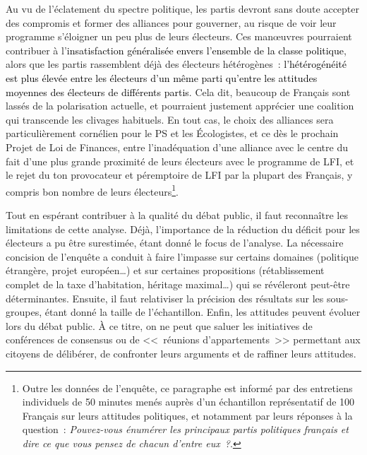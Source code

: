 \documentclass[12pt,french]{article}
\newcommand{\blue}[1]{\textcolor{black}{#1}} %
\begin{document}
Au vu de l'éclatement du spectre politique, les partis devront sans doute accepter des compromis et former des alliances pour gouverner, au risque de voir leur programme s'éloigner un peu plus de leurs électeurs. Ces manœuvres pourraient contribuer à l'\blue{insatisfaction généralisée envers l'ensemble de la classe politique}, alors que les partis rassemblent déjà des électeurs hétérogènes~: \blue{l'hétérogénéité est plus élevée entre les électeurs d'un même parti qu'entre les attitudes moyennes des électeurs de différents partis}. %
Cela dit, beaucoup de Français sont lassés de la polarisation actuelle, et pourraient justement apprécier une coalition qui transcende les clivages habituels. 
En tout cas, le choix des alliances sera particulièrement cornélien pour le PS et les Écologistes, et ce dès le prochain Projet de Loi de Finances, entre %
l'inadéquation d'une alliance avec le centre du fait d'une plus grande proximité de leurs électeurs avec le programme de LFI, et le rejet du ton provocateur et péremptoire de LFI par la plupart des Français, y compris bon nombre de leurs électeurs\footnote{Outre les données de l'enquête, ce paragraphe est informé par des entretiens individuels de 50 minutes menés auprès d'un échantillon représentatif de 100 Français sur leurs attitudes politiques, et notamment par leurs réponses à la question~: \textit{Pouvez-vous énumérer les principaux partis politiques français et dire ce que vous pensez de chacun d'entre eux~?}.}.%

Tout en espérant contribuer à la qualité du débat public, il faut reconnaître les limitations de cette analyse. Déjà, l'importance de la réduction du déficit pour les électeurs a pu être surestimée, étant donné le focus de l'analyse. La nécessaire concision de l'enquête a conduit à faire l'impasse sur certains domaines (politique étrangère, projet européen\dots{}) et sur certaines propositions (rétablissement complet de la taxe d'habitation, héritage maximal\dots{}) %
qui se révéleront peut-être déterminantes. Ensuite, il faut relativiser la précision des résultats sur les sous-groupes, étant donné la taille de l'échantillon. Enfin, les attitudes peuvent évoluer lors du débat public. À ce titre, on ne peut que saluer les initiatives de conférences de consensus ou de <<~réunions d'appartements~>> permettant aux citoyens de délibérer, de confronter leurs arguments et de raffiner leurs attitudes. 
\end{document}
